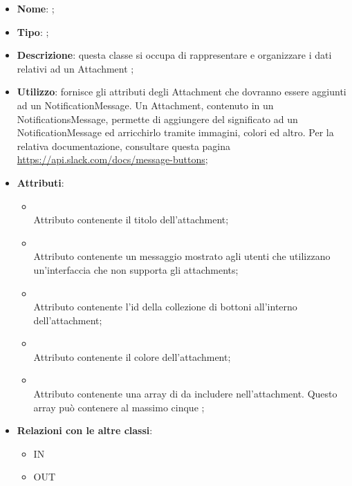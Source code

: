 \begin{itemize}
	\item \textbf{Nome}: ;
	\item \textbf{Tipo}: ;
	\item \textbf{Descrizione}: questa classe si occupa di rappresentare e organizzare i dati relativi ad un Attachment
;
	\item \textbf{Utilizzo}: fornisce gli attributi degli Attachment che dovranno essere aggiunti ad un NotificationMessage.
Un Attachment, contenuto in un NotificationsMessage, permette di aggiungere del significato ad un NotificationMessage ed arricchirlo tramite immagini, colori ed altro.
Per la relativa documentazione, consultare questa pagina \url{https://api.slack.com/docs/message-buttons};
	\item \textbf{Attributi}:
	\begin{itemize}
		\item[]  \\
		Attributo contenente il titolo dell'attachment;
		\item[]  \\
		Attributo contenente un messaggio mostrato agli utenti che utilizzano un'interfaccia che non supporta gli attachments;
		\item[]  \\
		Attributo contenente l'id della collezione di bottoni all'interno dell'attachment;
		\item[]  \\
		Attributo contenente il colore dell'attachment;
		\item[]  \\
		Attributo contenente una array di  da includere nell'attachment. Questo array può contenere al massimo cinque ;
	\end{itemize}
	\item \textbf{Relazioni con le altre classi}:
	\begin{itemize}
		\item IN \hyperlink{NotificationMessage_label}{}
		\item OUT \hyperlink{Action_label}{}
	\end{itemize}
\end{itemize}
\FloatBarrier

